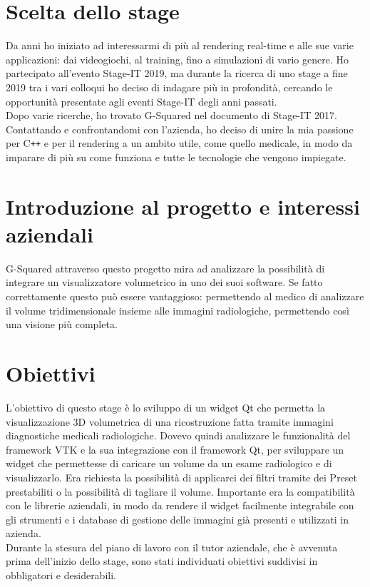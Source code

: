 \section{Scelta dello stage}
\label{scelta-dello-stage}
Da anni ho iniziato ad interessarmi di più al rendering real-time e alle sue varie applicazioni: dai videogiochi, al training, fino a simulazioni di vario genere.
Ho partecipato all'evento Stage-IT 2019, ma durante la ricerca di uno stage a fine 2019 tra i vari colloqui ho deciso di indagare più in profondità, cercando le opportunità presentate agli eventi Stage-IT degli anni passati.
\\
Dopo varie ricerche, ho trovato G-Squared nel documento di Stage-IT 2017. Contattando e confrontandomi con l'azienda, ho deciso di unire la mia passione per C\texttt{++} e per il rendering a un ambito utile, come quello medicale, in modo da imparare di più su come funziona e tutte le tecnologie che vengono impiegate.

\section{Introduzione al progetto e interessi aziendali}
G-Squared attraverso questo progetto mira ad analizzare la possibilità di integrare un visualizzatore volumetrico in uno dei suoi software. Se fatto correttamente questo può essere vantaggioso: permettendo al medico di analizzare il volume tridimensionale insieme alle immagini radiologiche, permettendo così una visione più completa.

\section{Obiettivi}
L'obiettivo di questo stage è lo sviluppo di un widget Qt che permetta la visualizzazione 3D volumetrica di una ricostruzione fatta tramite immagini diagnostiche medicali radiologiche. Dovevo quindi analizzare le funzionalità del framework VTK e la sua integrazione con il framework Qt, per sviluppare un widget che permettesse di caricare un volume da un esame radiologico e di visualizzarlo. Era richiesta la possibilità di applicarci dei filtri tramite dei Preset prestabiliti o la possibilità di tagliare il volume.
Importante era la compatibilità con le librerie aziendali, in modo da rendere il widget facilmente integrabile con gli strumenti e i database di gestione delle immagini già presenti e utilizzati in azienda.
\\
Durante la stesura del piano di lavoro con il tutor aziendale, che è avvenuta prima dell’inizio dello stage, sono stati individuati obiettivi suddivisi in obbligatori e desiderabili.

